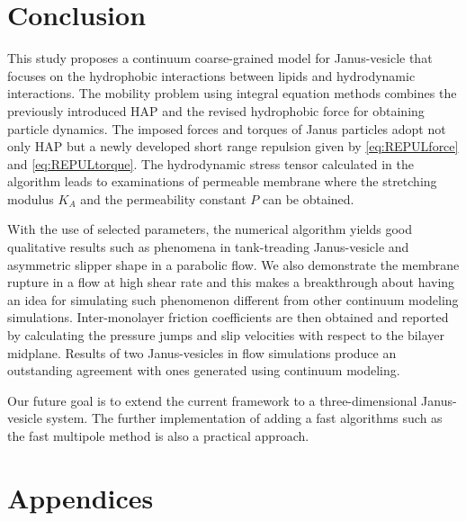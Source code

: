 \documentclass[lineno]{jfm}
\begin{document}
\section{\label{conclusion}Conclusion}




This study proposes a continuum coarse-grained model for Janus-vesicle that focuses on the 
hydrophobic interactions between lipids and hydrodynamic interactions.
The mobility problem using integral equation methods combines the previously introduced HAP and the 
revised hydrophobic force for obtaining particle dynamics. 
The imposed forces and torques of Janus particles adopt not only HAP but a newly developed short 
range repulsion given by \ref{eq:REPULforce} and \ref{eq:REPULtorque}.
The hydrodynamic stress tensor calculated in the algorithm leads to examinations of permeable 
membrane where the stretching modulus $K_A$ and the permeability constant $P$ can be obtained.


With the use of selected parameters, the numerical algorithm yields good qualitative results such as
phenomena in tank-treading Janus-vesicle and asymmetric slipper shape in a parabolic flow. 
We also demonstrate the membrane rupture in a flow at high shear rate and this makes a breakthrough 
about having an idea for simulating such phenomenon different from other continuum modeling simulations.
Inter-monolayer friction coefficients are then obtained and reported by calculating the pressure jumps and
slip velocities with respect to the bilayer midplane.
Results of two Janus-vesicles in flow simulations produce an outstanding agreement with ones generated 
using continuum modeling.

Our future goal is to extend the current framework to a three-dimensional Janus-vesicle system. 
The further implementation of adding a fast algorithms such as the fast multipole method is also a 
practical approach.







\begin{acknowledgments}
\end{acknowledgments}

\appendix

\section{Appendices}
\label{sec:appendixA}
\end{document}
